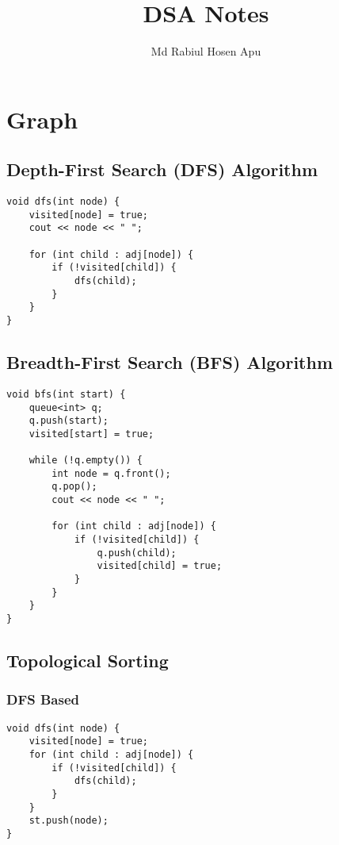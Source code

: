 \documentclass{article}
\title{DSA Notes}
\author{Md Rabiul Hosen Apu}
\begin{document}
\maketitle

\section{Graph}
\subsection{Depth-First Search (DFS) Algorithm}
\begin{verbatim}
void dfs(int node) {
    visited[node] = true;
    cout << node << " ";

    for (int child : adj[node]) {
        if (!visited[child]) {
            dfs(child);
        }
    }
}
\end{verbatim}

\subsection{Breadth-First Search (BFS) Algorithm}
\begin{verbatim}
void bfs(int start) {
    queue<int> q;
    q.push(start);
    visited[start] = true;

    while (!q.empty()) {
        int node = q.front();
        q.pop();
        cout << node << " ";

        for (int child : adj[node]) {
            if (!visited[child]) {
                q.push(child);
                visited[child] = true;
            }
        }
    }
}
\end{verbatim}
\subsection{Topological Sorting}

\subsubsection{DFS Based}
\begin{verbatim}
void dfs(int node) {
    visited[node] = true;
    for (int child : adj[node]) {
        if (!visited[child]) {
            dfs(child);
        }
    }
    st.push(node);
}
\end{verbatim}
\end{document}
